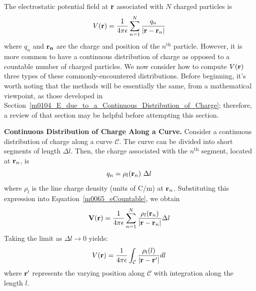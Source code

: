 

\label{m0065_V_due_to_a_Continuous_Distribution_of_Charge} %

The electrostatic potential field at ${\bf r}$ associated with $N$ charged particles is
%
\begin{equation}
V({\bf r}) = \frac{1}{4\pi\epsilon} \sum_{n=1}^N { \frac{q_n}{\left|{\bf r}-{\bf r}_n\right|} }
\label{m0065_eCountable}
\end{equation}
%
where $q_n$ and ${\bf r_n}$ are the charge and position of the $n^{\mbox{th}}$ particle.
However, it is more common to have a continuous distribution of charge as opposed to a countable number of charged particles.
We now consider how to compute $V({\bf r})$ three types of these commonly-encountered distributions.
Before beginning, it's worth noting that the methods will be essentially the same, from a mathematical viewpoint, as those developed in Section~\ref{m0104_E_due_to_a_Continuous_Distribution_of_Charge}; therefore, a review of that section may be helpful before attempting this section.


{\bf Continuous Distribution of Charge Along a Curve.}
Consider a continuous distribution of charge along a curve $\mathcal{C}$.
The curve can be divided into short segments of length $\Delta l$.  
Then, the charge associated with the $n^{\mbox{th}}$ segment, located at ${\bf r}_n$, is
%
\begin{equation}
q_n = \rho_l({\bf r}_n)~\Delta l
\end{equation}
%
where $\rho_l$ is the line charge density (units of C/m) at ${\bf r}_n$.
Substituting this expression into Equation~\ref{m0065_eCountable}, we obtain
%
\begin{equation}
{\bf V}({\bf r}) = \frac{1}{4\pi\epsilon} \sum_{n=1}^{N} { \frac{\rho_l({\bf r}_n)}{\left|{\bf r}-{\bf r}_n\right|} \Delta l}
\end{equation}
%
Taking the limit as $\Delta l\to 0$ yields:
%
\begin{equation}
V({\bf r}) = \frac{1}{4\pi\epsilon} \int_{\mathcal C} { \frac{\rho_l(l)}{\left|{\bf r}-{\bf r}'\right|} dl}
\label{m0065_eLineCharge}
\end{equation}
%
where ${\bf r}'$ represents the varying position along ${\mathcal C}$ with integration along the length $l$.


